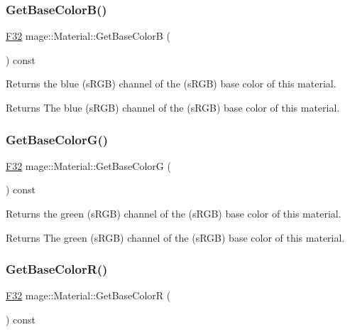\subsubsection{\texorpdfstring{Get\+Base\+Color\+B()}{GetBaseColorB()}}
{\footnotesize\ttfamily \hyperlink{namespacemage_aa97e833b45f06d60a0a9c4fc22ae02c0}{F32} mage\+::\+Material\+::\+Get\+Base\+ColorB (\begin{DoxyParamCaption}{ }\end{DoxyParamCaption}) const\hspace{0.3cm}{\ttfamily [noexcept]}}

Returns the blue (s\+R\+GB) channel of the (s\+R\+GB) base color of this material.

\begin{DoxyReturn}{Returns}
The blue (s\+R\+GB) channel of the (s\+R\+GB) base color of this material. 
\end{DoxyReturn}
\hypertarget{structmage_1_1_material_a74686fb74ca82f32d9e9ea6c30b182e5}{}\label{structmage_1_1_material_a74686fb74ca82f32d9e9ea6c30b182e5} 
\subsubsection{\texorpdfstring{Get\+Base\+Color\+G()}{GetBaseColorG()}}
{\footnotesize\ttfamily \hyperlink{namespacemage_aa97e833b45f06d60a0a9c4fc22ae02c0}{F32} mage\+::\+Material\+::\+Get\+Base\+ColorG (\begin{DoxyParamCaption}{ }\end{DoxyParamCaption}) const\hspace{0.3cm}{\ttfamily [noexcept]}}

Returns the green (s\+R\+GB) channel of the (s\+R\+GB) base color of this material.

\begin{DoxyReturn}{Returns}
The green (s\+R\+GB) channel of the (s\+R\+GB) base color of this material. 
\end{DoxyReturn}
\hypertarget{structmage_1_1_material_ae9b271a0557e61f4dfb926780ec591ef}{}\label{structmage_1_1_material_ae9b271a0557e61f4dfb926780ec591ef} 
\subsubsection{\texorpdfstring{Get\+Base\+Color\+R()}{GetBaseColorR()}}
{\footnotesize\ttfamily \hyperlink{namespacemage_aa97e833b45f06d60a0a9c4fc22ae02c0}{F32} mage\+::\+Material\+::\+Get\+Base\+ColorR (\begin{DoxyParamCaption}{ }\end{DoxyParamCaption}) const\hspace{0.3cm}{\ttfamily [noexcept]}}

